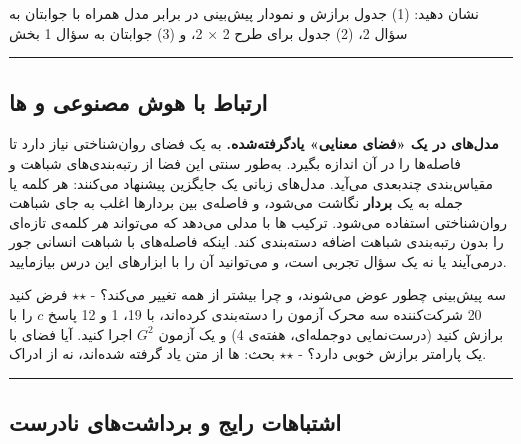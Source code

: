\subsubsection{\texorpdfstring{}{lab check-off}}

نشان دهید: (1) جدول برازش و نمودار پیش‌بینی  در برابر مدل
 همراه با جوابتان به سؤال 2، (2) جدول  برای طرح 2 ×
2، و (3) جوابتان به سؤال 1 بخش 

\begin{center}\rule{0.5\linewidth}{0.5pt}\end{center}

\subsection{\texorpdfstring{ارتباط با هوش مصنوعی و
ها}{ارتباط با هوش مصنوعی و LLMها}}

\textbf{مدل‌های  در یک «فضای معنایی» یادگرفته‌شده.} 
به یک فضای روان‌شناختی نیاز دارد تا فاصله‌ها را در آن اندازه بگیرد. به‌طور
سنتی این فضا از رتبه‌بندی‌های شباهت و مقیاس‌بندی چندبعدی  می‌آید.
مدل‌های زبانی یک جایگزین پیشنهاد می‌کنند: هر کلمه یا جمله به یک
\textbf{بردار } نگاشت می‌شود، و فاصله‌ی بین بردارها اغلب به
جای شباهت روان‌شناختی استفاده می‌شود. ترکیب ها با 
مدلی می‌دهد که می‌تواند \emph{هر} کلمه‌ی تازه‌ای را بدون رتبه‌بندی شباهت
اضافه دسته‌بندی کند. اینکه فاصله‌های  با شباهت انسانی جور
درمی‌آیند یا نه یک سؤال تجربی است، و می‌توانید آن را با ابزارهای این درس
بیازمایید.

سه پیش‌بینی چطور عوض می‌شوند، و چرا  بیشتر از همه تغییر
می‌کند؟ - \ensuremath{\star}\ensuremath{\star} فرض کنید 20 شرکت‌کننده سه محرک آزمون را دسته‌بندی کرده‌اند، با
19، 1 و 12 پاسخ  \(c\) را با  برازش کنید (درست‌نمایی
دوجمله‌ای، هفته‌ی 4) و یک آزمون \(G^2\) اجرا کنید. آیا فضای 
با یک پارامتر برازش خوبی دارد؟ - \ensuremath{\star}\ensuremath{\star} بحث: ها از متن یاد
گرفته شده‌اند، نه از ادراک.

\begin{center}\rule{0.5\linewidth}{0.5pt}\end{center}

\subsection{اشتباهات رایج و برداشت‌های نادرست}

